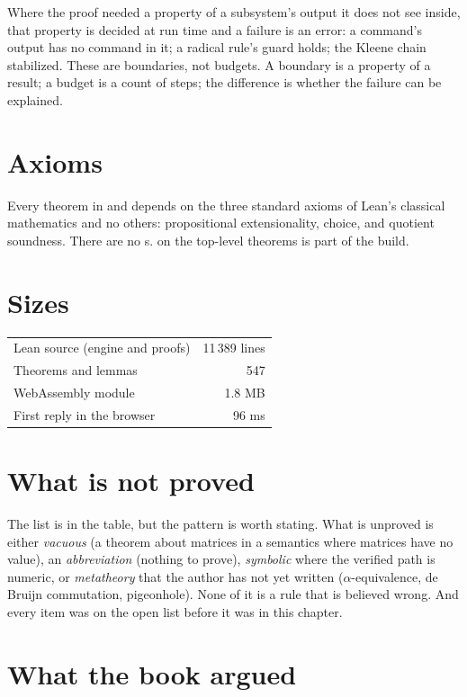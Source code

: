 Where the proof needed a property of a subsystem's output it does not see inside, that property is
decided at run time and a failure is an error: a command's output has no command in it; a radical
rule's guard holds; the Kleene chain stabilized. These are boundaries, not budgets. A boundary is a
property of a result; a budget is a count of steps; the difference is whether the failure can be
explained.

\section{Axioms}

Every theorem in  and  depends on the three standard axioms of Lean's
classical mathematics and no others: propositional extensionality, choice, and quotient soundness.
There are no s.  on the top-level theorems is part of the build.

\section{Sizes}

\begin{center}
\begin{tabular}{lr}
  Lean source (engine and proofs) & 11\,389 lines \\
  Theorems and lemmas & 547 \\
  WebAssembly module & 1.8 MB \\
  First reply in the browser & 96 ms \\
\end{tabular}
\end{center}

\section{What is not proved}

The list is in the table, but the pattern is worth stating. What is unproved is either
\emph{vacuous} (a theorem about matrices in a semantics where matrices have no value), an
\emph{abbreviation} (nothing to prove), \emph{symbolic} where the verified path is numeric, or
\emph{metatheory} that the author has not yet written ($\alpha$-equivalence, de Bruijn
commutation, pigeonhole). None of it is a rule that is believed wrong. And every item was on the
open list before it was in this chapter.

\section{What the book argued}

